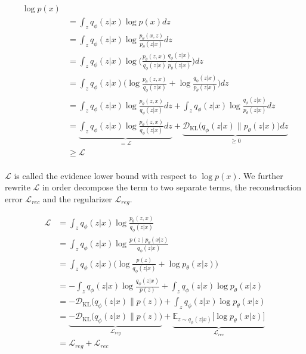 \begin{align*}
  \log p(x)\\
  &= \int_z q_\phi(z|x) \log p(x) dz\\
  &= \int_z q_\phi(z|x) \log \frac{p_\theta(x,z)}{p_\theta(z|x)} dz \tag{Bayes' rule}\\
  &= \int_z q_\phi(z|x) \log\bigg(\frac{p_\theta(z,x)}{q_\phi(z|x)} \frac{q_\phi(z|x)}{p_\theta(z|x)}\bigg) dz \tag{Chain rule}\\
  &= \int_z q_\phi(z|x) \bigg(\log\frac{p_\theta(z,x)}{q_\phi(z|x)} + \log\frac{q_\phi(z|x)}{p_\theta(z|x)}\bigg) dz\\
  &= \int_z q_\phi(z|x) \log \frac{p_\theta(z,x)}{q_\phi(z|x)} dz + \int_z q_\phi(z|x) \log\frac{q_\phi(z|x)}{p_\theta(z|x)} dz\\
  &= \underbrace{\int_z q_\phi(z|x) \log \frac{p_\theta(z,x)}{q_\phi(z|x)} dz}_{= \mathcal{L}}+ \underbrace{\mathcal{D}_{\mathrm{KL}}\big(q_\phi(z|x) \| p_\theta(z|x)\big) dz}_{\geq 0}\\
  &\geq \mathcal{L}\\
\end{align*}

$\mathcal{L}$ is called the evidence lower bound with respect to $\log p(x)$.
We further rewrite $\mathcal{L}$ in order decompose the term to two separate terms, the reconstruction error $\mathcal{L}_{rec}$ and the regularizer $\mathcal{L}_{reg}$.

\begin{align*}
  \mathcal{L}
  &= \int_z q_\phi(z|x) \log\frac{p_\theta(z,x)}{q_\phi(z|x)}\\
  &= \int_z q_\phi(z|x) \log\frac{p(z) p_\theta(x|z)}{q_\phi(z|x)} \tag{we assume that x is conditionally dependent on z}\\
  &= \int_z q_\phi(z|x) \bigg(\log\frac{p(z)}{q_\phi(z|x)} + \log p_\theta(x|z)\bigg)\\
  &= -\int_z q_\phi(z|x) \log\frac{q_\phi(z|x)}{p(z)} + \int_z q_\phi(z|x) \log p_\theta(x|z)\\
  &= -\mathcal{D}_{\mathrm{KL}}\big(q_\phi(z|x) \| p(z)\big) + \int_z q_\phi(z|x) \log p_\theta(x|z)\\
  &= \underbrace{-\mathcal{D}_{\mathrm{KL}}\big(q_\phi(z|x) \| p(z)\big)}_{\mathcal{L}_{reg}} + \underbrace{\mathbb{E}_{z \sim q_\phi(z|x)}\big[ \log p_\theta(x|z)\big]}_{\mathcal{L}_{rec}}\\
  &= \mathcal{L}_{reg} + \mathcal{L}_{rec}
\end{align*}
